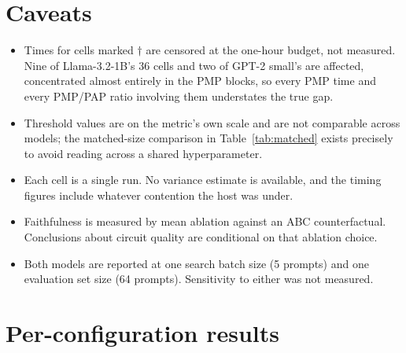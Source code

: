\documentclass[11pt,a4paper]{article}
\begin{document}
\section*{Caveats}

\begin{itemize}
  \item Times for cells marked $\dagger$ are censored at the one-hour budget, not measured.
    Nine of Llama-3.2-1B's 36 cells and two of GPT-2 small's are affected, concentrated
    almost entirely in the PMP blocks, so every PMP time and every PMP/PAP ratio involving them
    understates the true gap.
  \item Threshold values are on the metric's own scale and are not comparable across models;
    the matched-size comparison in Table~\ref{tab:matched} exists precisely to avoid reading
    across a shared hyperparameter.
  \item Each cell is a single run. No variance estimate is available, and the timing figures
    include whatever contention the host was under.
  \item Faithfulness is measured by mean ablation against an ABC counterfactual. Conclusions
    about circuit quality are conditional on that ablation choice.
  \item Both models are reported at one search batch size (5 prompts) and one evaluation
    set size (64 prompts). Sensitivity to either was not measured.
\end{itemize}

\appendix
\section{Per-configuration results}
\end{document}
